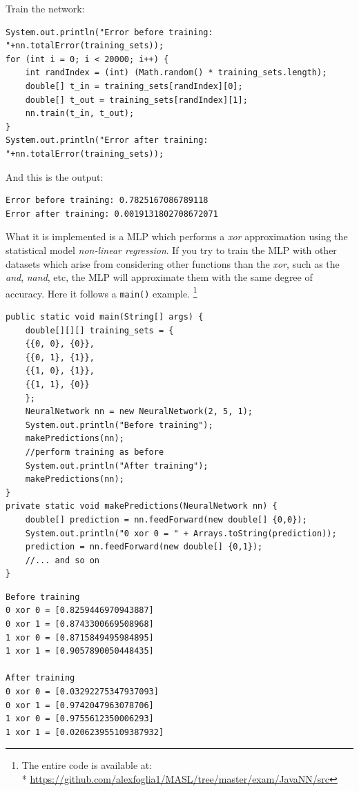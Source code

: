 \documentclass[10pt,a4paper]{article}
\begin{document}
Train the network:
\begin{lstlisting}
System.out.println("Error before training: "+nn.totalError(training_sets));
for (int i = 0; i < 20000; i++) {
	int randIndex = (int) (Math.random() * training_sets.length);
	double[] t_in = training_sets[randIndex][0];
	double[] t_out = training_sets[randIndex][1];
	nn.train(t_in, t_out);
}
System.out.println("Error after training: "+nn.totalError(training_sets));
\end{lstlisting}
And this is the output:
\begin{lstlisting}
Error before training: 0.7825167086789118
Error after training: 0.0019131802708672071
\end{lstlisting}
What it is implemented is a MLP which performs a \emph{xor} approximation using the statistical model \emph{non-linear regression}. If you try to train the MLP with other datasets which arise from considering other functions than the \emph{xor}, such as the \emph{and}, \emph{nand}, etc, the MLP will approximate them with the same degree of accuracy. Here it follows a \texttt{main()} example.
\footnote{The entire code is available at:\\* \href{https://github.com/alexfoglia1/MASL/tree/master/exam/JavaNN/src}{https://github.com/alexfoglia1/MASL/tree/master/exam/JavaNN/src}}
\begin{lstlisting}
public static void main(String[] args) {
	double[][][] training_sets = {
	{{0, 0}, {0}},
	{{0, 1}, {1}},
	{{1, 0}, {1}},
	{{1, 1}, {0}}
	};
	NeuralNetwork nn = new NeuralNetwork(2, 5, 1);
	System.out.println("Before training");
	makePredictions(nn);
	//perform training as before
	System.out.println("After training");
	makePredictions(nn);
}
private static void makePredictions(NeuralNetwork nn) {
	double[] prediction = nn.feedForward(new double[] {0,0});
	System.out.println("0 xor 0 = " + Arrays.toString(prediction));
	prediction = nn.feedForward(new double[] {0,1});
	//... and so on
}
\end{lstlisting}
\begin{lstlisting}
Before training
0 xor 0 = [0.8259446970943887]
0 xor 1 = [0.8743300669508968]
1 xor 0 = [0.8715849495984895]
1 xor 1 = [0.9057890050448435]

After training
0 xor 0 = [0.03292275347937093]
0 xor 1 = [0.9742047963078706]
1 xor 0 = [0.9755612350006293]
1 xor 1 = [0.020623955109387932]
\end{lstlisting}
\end{document}

